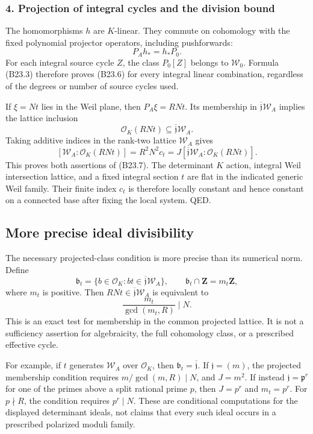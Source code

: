 \documentclass[11pt,a4paper]{article}
\theoremstyle{definition}
\begin{document}
\subsubsection{4. Projection of integral cycles and the division bound}\label{projection-of-integral-cycles-and-the-division-bound}

The homomorphisms \(h\) are \(K\)-linear. They commute on cohomology with the fixed polynomial projector operators, including pushforwards: \[
 P_Ah_*=h_*P_0.
\] For each integral source cycle \(Z\), the class \(P_0[Z]\) belongs to \(\mathscr W_0\). Formula (B23.3) therefore proves (B23.6) for every integral linear combination, regardless of the degrees or number of source cycles used.

If \(\xi=Nt\) lies in the Weil plane, then \(P_A\xi=RNt\). Its membership in \(\overline{\mathfrak j}\mathscr W_A\) implies the lattice inclusion \[
 \mathcal O_K(RNt)\subseteq\overline{\mathfrak j}\mathscr W_A.
\] Taking additive indices in the rank-two lattice \(\mathscr W_A\) gives \[
 [\mathscr W_A:\mathcal O_K(RNt)]
 =R^2N^2c_t
 =J[\overline{\mathfrak j}\mathscr W_A:\mathcal O_K(RNt)].
\] This proves both assertions of (B23.7). The determinant \(K\) action, integral Weil intersection lattice, and a fixed integral section \(t\) are flat in the indicated generic Weil family. Their finite index \(c_t\) is therefore locally constant and hence constant on a connected base after fixing the local system. QED.

\subsection{More precise ideal divisibility}\label{more-precise-ideal-divisibility}

The necessary projected-class condition is more precise than its numerical norm. Define \[
 \mathfrak b_t=\{b\in\mathcal O_K:bt\in\overline{\mathfrak j}\mathscr W_A\},
 \qquad
 \mathfrak b_t\cap\mathbf Z=m_t\mathbf Z,
\tag{B23.13}
\] where \(m_t\) is positive. Then \(RNt\in\overline{\mathfrak j}\mathscr W_A\) is equivalent to \[
 \frac{m_t}{\gcd(m_t,R)}\mid N.
\tag{B23.14}
\] This is an exact test for membership in the common projected lattice. It is not a sufficiency assertion for algebraicity, the full cohomology class, or a prescribed effective cycle.

For example, if \(t\) generates \(\mathscr W_A\) over \(\mathcal O_K\), then \(\mathfrak b_t=\overline{\mathfrak j}\). If \(\mathfrak j=(m)\), the projected membership condition requires \(m/\gcd(m,R)\mid N\), and \(J=m^2\). If instead \(\mathfrak j=\mathfrak p^r\) for one of the primes above a split rational prime \(p\), then \(J=p^r\) and \(m_t=p^r\). For \(p\nmid R\), the condition requires \(p^r\mid N\). These are conditional computations for the displayed determinant ideals, not claims that every such ideal occurs in a prescribed polarized moduli family.
\end{document}
